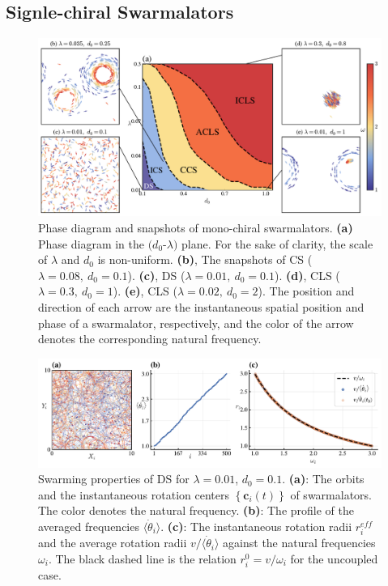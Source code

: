 \documentclass{article}
\begin{document}
\subsection{Signle-chiral Swarmalators}
\begin{figure}[H]
    \includegraphics[width=\textwidth]{./figs/MonoChiralPhaseDiagram.pdf}
    \caption{
        \label{fig:MonoPhaseDiagram} 
        Phase diagram and snapshots of mono-chiral swarmalators.
        \textbf{(a)} Phase diagram in the $(d_0$-$\lambda)$ plane. 
        For the sake of clarity, the scale of $\lambda$ and $d_0$ is non-uniform.
        \textbf{(b)}, The snapshots of CS ($\lambda=0.08,\ d_0=0.1$). 
        \textbf{(c)}, DS ($\lambda=0.01,\ d_0=0.1$).
        \textbf{(d)}, CLS ($\lambda=0.3,\ d_0=1$).
        \textbf{(e)}, CLS ($\lambda=0.02,\ d_0=2$). The position and direction of each arrow are the instantaneous spatial position and phase of a swarmalator, respectively, and the color of the arrow denotes the corresponding natural frequency.
    }
\end{figure}

\begin{figure}[H]
    \includegraphics[width=\textwidth]{./figs/mono-DS.pdf}
    \caption{
        \label{fig:mono-DS} Swarming properties of DS for $\lambda =0.01$, $d_0 =0.1$. 
        \textbf{(a)}: The orbits and the instantaneous rotation centers $\left\{ \mathbf{c}_i (t)\right\}$ of swarmalators. The color denotes the natural frequency.
        \textbf{(b)}: The profile of the averaged frequencies $\langle \dot{\theta}_i \rangle$.
        \textbf{(c)}: The instantaneous rotation radii $ r_i^{eff}$ and the average rotation radii $v/\langle \dot{\theta}_i \rangle$ against the natural frequencies $\omega_i$. The black dashed line is the relation $r_i^0 = v/\omega_i$ for the uncoupled case.
    }
\end{figure}
\end{document}

